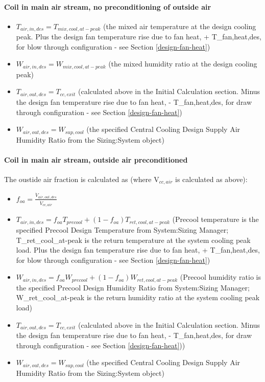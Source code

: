 \paragraph{\textbf{Coil in main air stream, no preconditioning of outside air} }\label{coil-in-main-air-stream-no-preconditioning-of-outside-air}

\begin{itemize}
\item
  \(T_{air,in,des} = T_{mix,cool,at-peak}\) (the mixed air temperature at the design cooling peak. Plus the design fan temperature rise due to fan heat, + T_{fan,heat,des}, for blow through configuration - see Section \ref{design-fan-heat})
\item
  \(W_{air,in,des} = W_{mix,cool,at-peak}\) (the mixed humidity ratio at the design cooling peak)
\item
  \(T_{air,out,des} = T_{cc,exit}\) (calculated above in the Initial Calculation section. Minus the design fan temperature rise due to fan heat, - T_{fan,heat,des}, for draw through configuration - see Section \ref{design-fan-heat})
\item
  \(W_{air,out,des} = W_{sup,cool}\) (the specified Central Cooling Design Supply Air Humidity Ratio from the Sizing:System object)
\end{itemize}

\paragraph{\textbf{Coil in main air stream, outside air preconditioned} }\label{coil-in-main-air-stream-outside-air-preconditioned}

The oustide air fraction is calculated as (where V\(_{cc,air}\) is calculated as above):

\begin{itemize}
\item
  \(f_{oa} = \frac{\dot V_{air,out,des}}{\dot{V}_{cc,air}}\)
\item
  \(T_{air,in,des} = f_{oa}T_{precool} + \left(1-f_{oa}\right)T_{ret,cool,at-peak}\) (Precool temperature is the specified Precool Design Temperature from System:Sizing Manager; T\_ret\_cool\_at-peak is the return temperature at the system cooling peak load. Plus the design fan temperature rise due to fan heat, + T_{fan,heat,des}, for blow through configuration - see Section \ref{design-fan-heat})
\item
  \(W_{air,in,des} = f_{oa}W_{precool} + \left(1-f_{oa}\right)W_{ret,cool,at-peak}\) (Precool humidity ratio is the specified Precool Design Humidity Ratio from System:Sizing Manager; W\_ret\_cool\_at-peak is the return humidity ratio at the system cooling peak load)
\item
  \(T_{air,out,des} = T_{cc,exit}\) (calculated above in the Initial Calculation section. Minus the design fan temperature rise due to fan heat, - T_{fan,heat,des}, for draw through configuration - see Section \ref{design-fan-heat}))
\item
  \(W_{air,out,des} = W_{sup,cool}\) (the specified Central Cooling Design Supply Air Humidity Ratio from the Sizing:System object)
\end{itemize}

